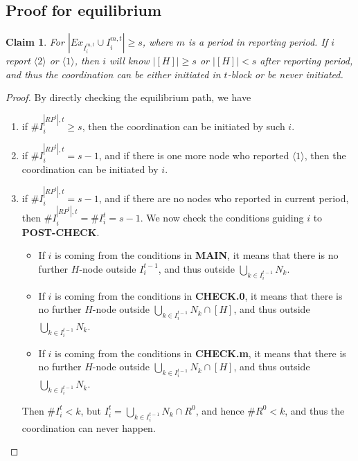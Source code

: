 \documentclass[12pt]{article}
\newtheorem{claim}{Claim}[subsubsection]
\theoremstyle{remark}
\theoremstyle{remark}
\begin{document}







\subsection{Proof for equilibrium}

\begin{claim}
\label{claim_either_success_or_fail}
For $|Ex_{I^{m,t}_i}\cup I^{m,t}_i|\geq s$, where $m$ is a period in reporting period. If $i$ report $\langle 2 \rangle$ or $\langle 1 \rangle$, then $i$ will know $|[H]|\geq s$ or $|[H]|<s$ after reporting period, and thus the coordination can be either initiated in $t$-block or be never initiated.
\end{claim}
\begin{proof}
By directly checking the equilibrium path, we have
\begin{enumerate}


\item if $\# I^{|RP^t|,t}_i\geq s$, then the coordination can be initiated by such $i$.
\item if $\# I^{|RP^t|,t}_i= s-1$, and if there is one more node who reported $\langle 1 \rangle$, then the coordination can be initiated by $i$.
\item if $\# I^{|RP^t|,t}_i= s-1$, and if there are no nodes who reported in current period, then $\# I^{|RP^t|,t}_i=\# I^{t}_i= s-1$. We now check the conditions guiding $i$ to \textbf{POST-CHECK}.
\begin{itemize}
\item If $i$ is coming from the conditions in \textbf{MAIN}, it means that there is no further $H$-node outside $I^{t-1}_i$, and thus outside $\bigcup_{k\in I^{t-1}_i}N_k$.
\item If $i$ is coming from the conditions in \textbf{CHECK.0}, it means that there is no further $H$-node outside $\bigcup_{k\in I^{t-1}_i}N_k\cap [H]$, and thus outside $\bigcup_{k\in I^{t-1}_i}N_k$. 
\item If $i$ is coming from the conditions in \textbf{CHECK.m}, it means that there is no further $H$-node outside $\bigcup_{k\in I^{t-1}_i}N_k\cap [H]$, and thus outside $\bigcup_{k\in I^{t-1}_i}N_k$. 
\end{itemize}
Then $\# I^{t}_i< k$, but $I^t_i=\bigcup_{k\in I^{t-1}_i}N_k\cap R^0$, and hence $\# R^0<k$, and thus the coordination can never happen.

\end{enumerate}


\end{proof}
\end{document}

